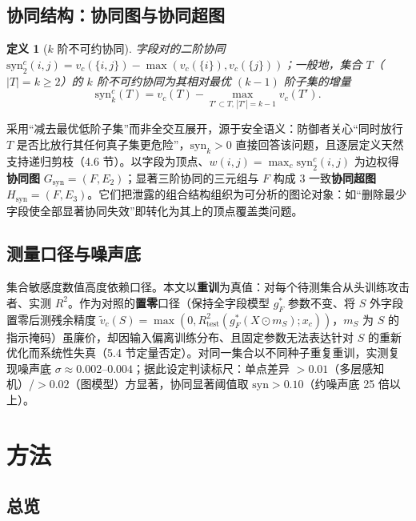 \documentclass[10.5pt,compsoc,UTF8]{CjC}
\theoremstyle{mystyle}
\newtheorem{definition}{定义}
\begin{document}
\subsection{协同结构：协同图与协同超图}

\begin{definition}[$k$ 阶不可约协同]
字段对的二阶协同 $\mathrm{syn}_2^c(i,j)=v_c(\{i,j\})-\max(v_c(\{i\}),v_c(\{j\}))$；一般地，集合 $T$（$|T|=k\ge2$）的 $k$ 阶不可约协同为其相对最优 $(k{-}1)$ 阶子集的增量
\begin{equation}
\mathrm{syn}_k^c(T)=v_c(T)-\max_{T'\subset T,\,|T'|=k-1} v_c(T').
\label{eq:synk}
\end{equation}
\end{definition}

采用“减去最优低阶子集”而非全交互展开，源于安全语义：防御者关心“同时放行 $T$ 是否比放行其任何真子集更危险”，$\mathrm{syn}_k>0$ 直接回答该问题，且逐层定义天然支持递归剪枝（4.6 节）。以字段为顶点、$w(i,j)=\max_{c}\mathrm{syn}_2^c(i,j)$ 为边权得\textbf{协同图} $G_{\mathrm{syn}}=(F,E_2)$；显著三阶协同的三元组与 $F$ 构成 3 一致\textbf{协同超图} $H_{\mathrm{syn}}=(F,E_3)$。它们把泄露的组合结构组织为可分析的图论对象：如“删除最少字段使全部显著协同失效”即转化为其上的顶点覆盖类问题。

\subsection{测量口径与噪声底}

集合敏感度数值高度依赖口径。本文以\textbf{重训}为真值：对每个待测集合从头训练攻击者、实测 $R^2$。作为对照的\textbf{置零}口径（保持全字段模型 $g^{*}_F$ 参数不变、将 $S$ 外字段置零后测残余精度 $\tilde v_c(S)=\max(0,R^2_{\mathrm{test}}(g^{*}_F(X\odot m_S);x_c))$，$m_S$ 为 $S$ 的指示掩码）虽廉价，却因输入偏离训练分布、且固定参数无法表达针对 $S$ 的重新优化而系统性失真（5.4 节定量否定）。对同一集合以不同种子重复重训，实测复现噪声底 $\sigma\approx0.002$--$0.004$；据此设定判读标尺：单点差异 $>0.01$（多层感知机）/$>0.02$（图模型）方显著，协同显著阈值取 $\mathrm{syn}>0.10$（约噪声底 25 倍以上）。

\section{\heiti 方法}

\subsection{总览}
\end{document}
